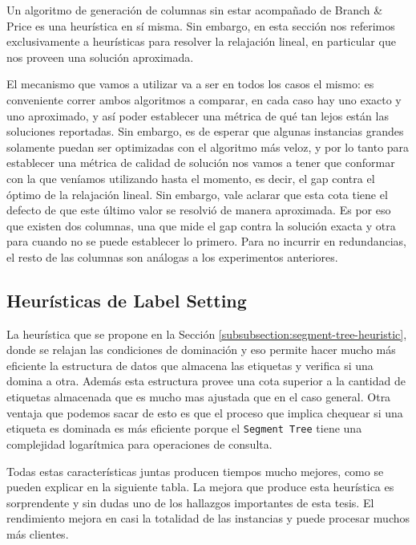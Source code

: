 Un algoritmo de generación de columnas sin estar acompañado de Branch \& Price es una heurística en sí misma. Sin embargo, en esta sección nos referimos exclusivamente a heurísticas para resolver la relajación lineal, en particular que nos proveen una solución aproximada. 

El mecanismo que vamos a utilizar va a ser en todos los casos el mismo: es conveniente correr ambos algoritmos a comparar, en cada caso hay uno exacto y uno aproximado, y así poder establecer una métrica de qué tan lejos están las soluciones reportadas. Sin embargo, es de esperar que algunas instancias grandes solamente puedan ser optimizadas con el algoritmo más veloz, y por lo tanto para establecer una métrica de calidad de solución nos vamos a tener que conformar con la que veníamos utilizando hasta el momento, es decir, el gap contra el óptimo de la relajación lineal. Sin embargo, vale aclarar que esta cota tiene el defecto de que este último valor se resolvió de manera aproximada. Es por eso que existen dos columnas, una que mide el gap contra la solución exacta y otra para cuando no se puede establecer lo primero. Para no incurrir en redundancias, el resto de las columnas son análogas a los experimentos anteriores.

\subsection{Heurísticas de Label Setting}
\label{section:experiments-label-setting-heur}

La heurística que se propone en la Sección \ref{subsubsection:segment-tree-heuristic}, donde se relajan las condiciones de dominación y eso permite hacer mucho más eficiente la estructura de datos que almacena las etiquetas y verifica si una domina a otra. Además esta estructura provee una cota superior a la cantidad de etiquetas almacenada que es mucho mas ajustada que en el caso general. Otra ventaja que podemos sacar de esto es que el proceso que implica chequear si una etiqueta es dominada es más eficiente porque el \texttt{Segment Tree} tiene una complejidad logarítmica para operaciones de consulta. 

Todas estas características juntas producen tiempos mucho mejores, como se pueden explicar en la siguiente tabla. La mejora que produce esta heurística es sorprendente y sin dudas uno de los hallazgos importantes de esta tesis. El rendimiento mejora en casi la totalidad de las instancias y puede procesar muchos más clientes.

